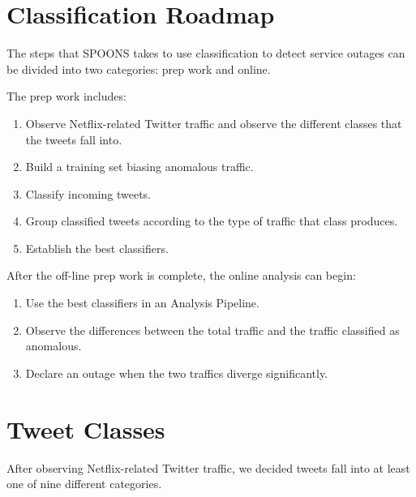 \documentclass[12pt]{ucthesis}
\begin{document}
\section{Classification Roadmap}
\label{class-roadmap}
The steps that SPOONS takes to use classification to detect service outages can be divided into two categories:
prep work and online.

The prep work includes:

\begin{enumerate}
   \item Observe Netflix-related Twitter traffic and observe the different classes that the tweets fall into.
   \item Build a training set biasing anomalous traffic.
   \item Classify incoming tweets.
   \item Group classified tweets according to the type of traffic that class produces.
   \item Establish the best classifiers.
\end{enumerate}

After the off-line prep work is complete, the online analysis can begin:

\begin{enumerate}
   \item Use the best classifiers in an Analysis Pipeline.
   \item Observe the differences between the total traffic and the traffic classified as anomalous.
   \item Declare an outage when the two traffics diverge significantly.
\end{enumerate}

\section{Tweet Classes}
\label{class-tweet-classes}
After observing Netflix-related Twitter traffic, we decided tweets fall into at least one of nine different categories.
\end{document}
